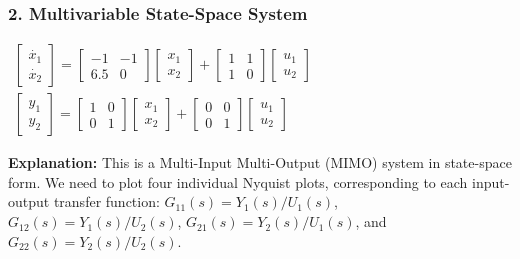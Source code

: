 \documentclass[a4paper,12pt]{article}
\begin{document}
	\subsubsection*{2. Multivariable State-Space System}
	$\begin{array}{l} \begin{bmatrix} \dot{x_1} \\ \dot{x_2} \end{bmatrix} = \begin{bmatrix} -1 & -1 \\ 6.5 & 0 \end{bmatrix} \begin{bmatrix} x_1 \\ x_2 \end{bmatrix} + \begin{bmatrix} 1 & 1 \\ 1 & 0 \end{bmatrix} \begin{bmatrix} u_1 \\ u_2 \end{bmatrix} \\ \begin{bmatrix} y_1 \\ y_2 \end{bmatrix} = \begin{bmatrix} 1 & 0 \\ 0 & 1 \end{bmatrix} \begin{bmatrix} x_1 \\ x_2 \end{bmatrix} + \begin{bmatrix} 0 & 0 \\ 0 & 1 \end{bmatrix} \begin{bmatrix} u_1 \\ u_2 \end{bmatrix} \end{array}$
	
	\textbf{Explanation:}
	This is a Multi-Input Multi-Output (MIMO) system in state-space form. We need to plot four individual Nyquist plots, corresponding to each input-output transfer function: $G_{11}(s) = Y_1(s)/U_1(s)$, $G_{12}(s) = Y_1(s)/U_2(s)$, $G_{21}(s) = Y_2(s)/U_1(s)$, and $G_{22}(s) = Y_2(s)/U_2(s)$.
	
\end{document}
